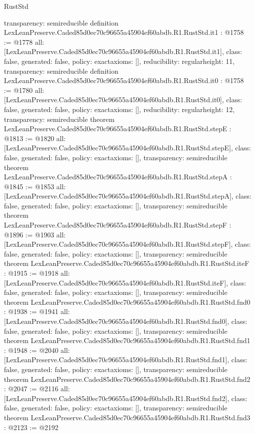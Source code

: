\begin{lexlean}{RustStd}
\begin{coremodule}
{  transparency: semireducible
}
definition LexLeanPreserve.Caded85d0ec70c96655a45904ef60abdb.R1.RustStd.it1 : @1758 := @1778 {
  all: [LexLeanPreserve.Caded85d0ec70c96655a45904ef60abdb.R1.RustStd.it1],
  class: false,
  generated: false,
  policy: exact{axioms: []},
  reducibility: regular{height: 11},
  transparency: semireducible
}
definition LexLeanPreserve.Caded85d0ec70c96655a45904ef60abdb.R1.RustStd.it0 : @1758 := @1780 {
  all: [LexLeanPreserve.Caded85d0ec70c96655a45904ef60abdb.R1.RustStd.it0],
  class: false,
  generated: false,
  policy: exact{axioms: []},
  reducibility: regular{height: 12},
  transparency: semireducible
}
theorem LexLeanPreserve.Caded85d0ec70c96655a45904ef60abdb.R1.RustStd.stepE : @1813 := @1820 {
  all: [LexLeanPreserve.Caded85d0ec70c96655a45904ef60abdb.R1.RustStd.stepE],
  class: false,
  generated: false,
  policy: exact{axioms: []},
  transparency: semireducible
}
theorem LexLeanPreserve.Caded85d0ec70c96655a45904ef60abdb.R1.RustStd.stepA : @1845 := @1853 {
  all: [LexLeanPreserve.Caded85d0ec70c96655a45904ef60abdb.R1.RustStd.stepA],
  class: false,
  generated: false,
  policy: exact{axioms: []},
  transparency: semireducible
}
theorem LexLeanPreserve.Caded85d0ec70c96655a45904ef60abdb.R1.RustStd.stepF : @1896 := @1903 {
  all: [LexLeanPreserve.Caded85d0ec70c96655a45904ef60abdb.R1.RustStd.stepF],
  class: false,
  generated: false,
  policy: exact{axioms: []},
  transparency: semireducible
}
theorem LexLeanPreserve.Caded85d0ec70c96655a45904ef60abdb.R1.RustStd.iteF : @1915 := @1918 {
  all: [LexLeanPreserve.Caded85d0ec70c96655a45904ef60abdb.R1.RustStd.iteF],
  class: false,
  generated: false,
  policy: exact{axioms: []},
  transparency: semireducible
}
theorem LexLeanPreserve.Caded85d0ec70c96655a45904ef60abdb.R1.RustStd.fnd0 : @1938 := @1941 {
  all: [LexLeanPreserve.Caded85d0ec70c96655a45904ef60abdb.R1.RustStd.fnd0],
  class: false,
  generated: false,
  policy: exact{axioms: []},
  transparency: semireducible
}
theorem LexLeanPreserve.Caded85d0ec70c96655a45904ef60abdb.R1.RustStd.fnd1 : @1948 := @2040 {
  all: [LexLeanPreserve.Caded85d0ec70c96655a45904ef60abdb.R1.RustStd.fnd1],
  class: false,
  generated: false,
  policy: exact{axioms: []},
  transparency: semireducible
}
theorem LexLeanPreserve.Caded85d0ec70c96655a45904ef60abdb.R1.RustStd.fnd2 : @2047 := @2116 {
  all: [LexLeanPreserve.Caded85d0ec70c96655a45904ef60abdb.R1.RustStd.fnd2],
  class: false,
  generated: false,
  policy: exact{axioms: []},
  transparency: semireducible
}
theorem LexLeanPreserve.Caded85d0ec70c96655a45904ef60abdb.R1.RustStd.fnd3 : @2123 := @2192 {
}
\end{coremodule}
\end{lexlean}
